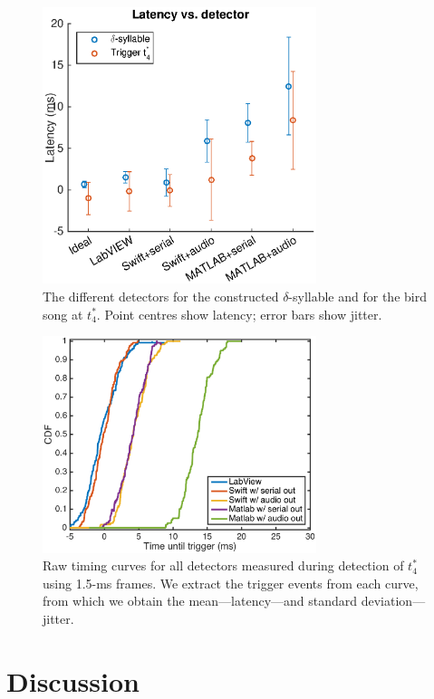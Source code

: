 \documentclass[10pt,letterpaper]{article}
\begin{document}
\begin{figure}
  \begin{center}
    \includegraphics[width=8cm]{Fig6}
  \end{center}
  \caption{The different detectors for the constructed
    $\delta$-syllable and for the bird song at $t^*_4$.  Point centres
    show latency; error bars show jitter.}
  \label{fig:TimingVsDetector}
\end{figure}

\begin{figure}
  \begin{center}
    \includegraphics[width=8cm]{Fig7}
  \end{center}
  \caption{Raw timing curves for all detectors measured during
    detection of $t^*_4$ using 1.5-ms frames.  We extract the trigger events from each curve, from which we obtain the mean---latency---and
    standard deviation---jitter.}
  \label{fig:timing}
\end{figure}


\section{Discussion}
\label{sec:conclusion}
\end{document}
